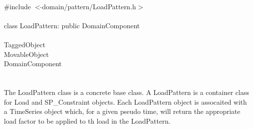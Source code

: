 
   \\
\indent \#include $<\tilde{ }$domain/pattern/LoadPattern.h$>$  \\

  \\
\indent class LoadPattern: public DomainComponent  \\

 \\
\indent TaggedObject \\
\indent MovableObject \\
\indent\indent DomainComponent \\
\indent\indent{} \\

 \\ 
\indent The LoadPattern class is a concrete base class. A
LoadPattern is a container class for Load and SP\_Constraint
objects. Each LoadPattern object is assocaited with a TimeSeries
object which, for a given pseudo time, will return the appropriate
load factor to be applied to th load in the LoadPattern. \\

